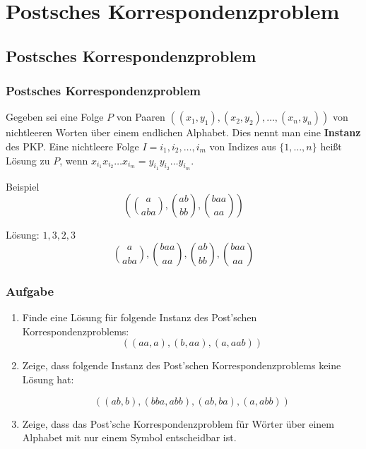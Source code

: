 \section{Postsches Korrespondenzproblem}
\subsection{Postsches Korrespondenzproblem}
\begin{frame}
\frametitle{Postsches Korrespondenzproblem}
Gegeben sei eine Folge $P$ von Paaren $((x_1, y_1), (x_2, y_2), \ldots, (x_n,y_n))$ von nichtleeren Worten über einem endlichen Alphabet. Dies nennt man eine \textbf{Instanz} des PKP.
Eine nichtleere Folge $I = i_1, i_2, \ldots, i_m$ von Indizes aus $\{1, \ldots, n\}$ heißt Lösung zu $P$, wenn $x_{i_1}x_{i_2}\ldots{}x_{i_m} = y_{i_1}y_{i_2}\ldots{}y_{i_m}$.
\begin{block}{Beispiel}
\begin{displaymath}
( {a \choose aba}, {ab \choose bb}, {baa \choose aa} )
\end{displaymath}

Lösung: $1,3,2,3$
\begin{displaymath}
{a \choose aba}, {baa \choose aa}, {ab \choose bb}, {baa \choose aa}
\end{displaymath}

\end{block}
\end{frame}

\begin{frame}
\frametitle{Aufgabe}
\begin{enumerate}
\item Finde eine Lösung für folgende Instanz des Post'schen Korrespondenzproblems: 
\[ ((aa, a), (b, aa), (a, aab)) \]
  \item Zeige, dass folgende Instanz des Post'schen Korrespondenzproblems
        keine Lösung hat:

        \[ ((ab, b), (bba, abb), (ab, ba), (a, abb)) \]

  \item Zeige, dass das Post'sche Korrespondenzproblem für Wörter
über einem Alphabet mit nur einem Symbol entscheidbar ist.
\end{enumerate}
\end{frame}

